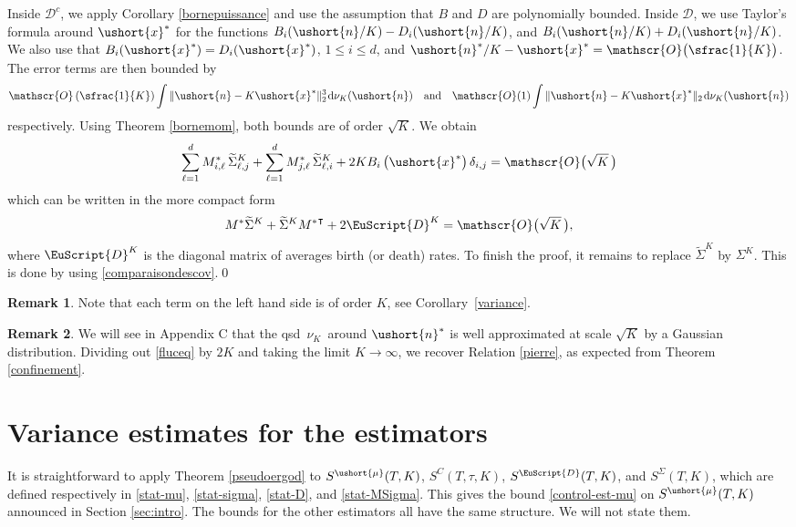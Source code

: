 \documentclass[10pt]{amsart}
\newcommand{\scaleto}[2]{#1}
\let\mathcal\mathscr
\numberwithin{equation}{section}
\theoremstyle{plain}
\theoremstyle{definition}
\newtheorem{remark}{Remark}[section]
\newcommand{\Oun}{\mathcal{O}(1)}
\newcommand{\sK}{K}
\newcommand{\vecn}{\ushort{n}}
\newcommand{\vecnf}{\ushort{n}^*}
\newcommand{\vecxf}{\ushort{x}^*}
\newcommand{\vmu}{\ushort{\mu}}
\newcommand{\nuk}{\nu_{K}}\let\snuk\nuk
\newcommand{\dd}{\hspace{1pt}\mathrm{d}}
\begin{document}
Inside $\mathcal{D}^c$, we apply Corollary \ref{bornepuissance} and use the assumption that $B$ and $D$ are polynomially
bounded. Inside $\mathcal{D}$, we use Taylor's formula around $\vecxf$ for the functions $B_i(\vecn/K)-D_i(\vecn/K)$, and
$B_i(\vecn/K)+D_i(\vecn/K)$. We also use that $B_{i}(\vecxf)=D_{i}(\vecxf)$, $1\le i\le d$, and $\vecnf/K-\vecxf=
\mathcal{O}\bigl(\sfrac{1}{K}\bigr)$. The error terms are then bounded by
\[
\mathcal{O}\left(\sfrac{1}{K}\right)\int \|\vecn-K\vecxf\|_{2}^{\scaleto{3}{4pt}} \dd \nuk(\vecn)\quad\text{and}\quad
\Oun \int \|\vecn-K\vecxf\|_{2} \dd \nuk(\vecn)
\]
respectively. Using Theorem \ref{bornemom}, both bounds are of order $\sqrt{K}$.
We obtain
\[
\sum_{\ell=1}^{d}M_{i,\ell}^{*}\,\widetilde{\Sigma}^{\sK}_{\ell,j}+
\sum_{\ell=1}^{d}M_{j,\ell}^*\,\widetilde{\Sigma}^{\sK}_{\ell,i}+2K B_{i}\left(\vecxf\right)\delta_{i,j}
=\mathcal{O}\bigl(\sqrt K\,\bigr)
\]
which can be written in the more compact form
\begin{equation}\label{fluceq}
M^* \widetilde{\Sigma}^{\sK}+\widetilde{\Sigma}^{\sK} {M^*}^{\intercal}+2\EuScript{D}^{\sK}=\mathcal{O}\bigl(\sqrt K\,\bigr),
\end{equation}
where $\EuScript{D}^{\sK}$ is the diagonal matrix of averages birth (or death) rates. To finish the proof, it remains to
replace $\widetilde\Sigma^{\sK}$ by $\Sigma^{\sK}$. This is done by using \eqref{comparaisondescov}.\qed

\begin{remark}
Note that each term on the left hand side is of order $K$, see Corollary~\ref{variance}.
\end{remark}
\begin{remark} We will see in Appendix C that the qsd $\,\nu_{K}\,$ around $\vecnf$ is well approximated at scale $\sqrt{K}$ by a Gaussian distribution.
Dividing out \eqref{fluceq} by $2K$ and taking the limit $K\to\infty$, we recover Relation \eqref{pierre}, as expected from Theorem \ref{confinement}.
\end{remark}

\section{Variance estimates for the estimators}
\label{sec:stat}

It is straightforward to apply Theorem \ref{pseudoergod} to $S^{\vmu}(T,K)$,
$S^{C}(T,\tau,K)$, $S^{{ \EuScript{D}}}(T,K)$, and
$S^{{ \Sigma}}(T,K)$, which are defined respectively in \eqref{stat-mu}, \eqref{stat-sigma}, \eqref{stat-D},
and \eqref{stat-MSigma}. This gives the bound \eqref{control-est-mu} on $S^{\vmu}(T,K)$ announced in
Section \ref{sec:intro}. The bounds for the other estimators all have the same structure. We will not state them.
\end{document}
